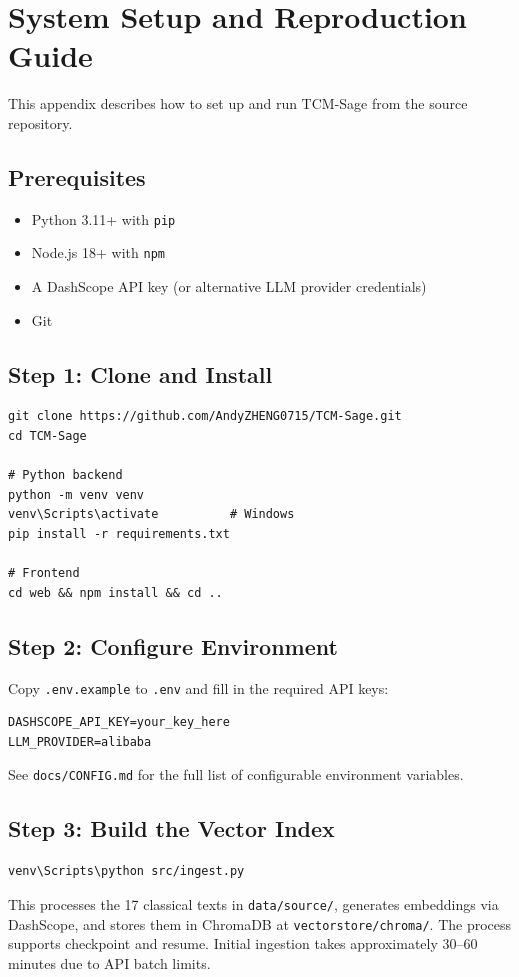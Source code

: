 \documentclass[11pt,a4paper]{report}
\begin{document}
\chapter{System Setup and Reproduction Guide}

This appendix describes how to set up and run TCM-Sage from the source repository.

\section*{Prerequisites}
\begin{itemize}
    \item Python 3.11+ with \texttt{pip}
    \item Node.js 18+ with \texttt{npm}
    \item A DashScope API key (or alternative LLM provider credentials)
    \item Git
\end{itemize}

\section*{Step 1: Clone and Install}
\begin{verbatim}
git clone https://github.com/AndyZHENG0715/TCM-Sage.git
cd TCM-Sage

# Python backend
python -m venv venv
venv\Scripts\activate          # Windows
pip install -r requirements.txt

# Frontend
cd web && npm install && cd ..
\end{verbatim}

\section*{Step 2: Configure Environment}
Copy \texttt{.env.example} to \texttt{.env} and fill in the required API keys:
\begin{verbatim}
DASHSCOPE_API_KEY=your_key_here
LLM_PROVIDER=alibaba
\end{verbatim}
See \texttt{docs/CONFIG.md} for the full list of configurable environment variables.

\section*{Step 3: Build the Vector Index}
\begin{verbatim}
venv\Scripts\python src/ingest.py
\end{verbatim}
This processes the 17 classical texts in \texttt{data/source/}, generates embeddings via DashScope, and stores them in ChromaDB at \texttt{vectorstore/chroma/}. The process supports checkpoint and resume. Initial ingestion takes approximately 30--60 minutes due to API batch limits.
\end{document}
